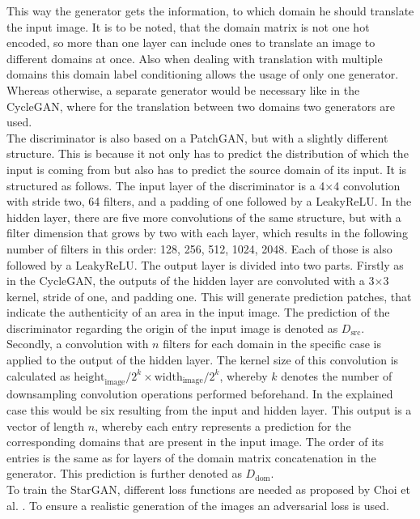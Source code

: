 This way the generator gets the information, to which domain he should translate the input image.
It is to be noted, that the domain matrix is not one hot encoded, so more than one layer can include ones to translate an image to different domains at once.
Also when dealing with translation with multiple domains this domain label conditioning allows the usage of only one generator.
Whereas otherwise, a separate generator would be necessary like in the CycleGAN, where for the translation between two domains two generators are used.\\
The discriminator is also based on a PatchGAN, but with a slightly different structure.
This is because it not only has to predict the distribution of which the input is coming from but also has to predict the source domain of its input.
It is structured as follows.
The input layer of the discriminator is a 4$\times$4 convolution with stride two, 64 filters, and a padding of one followed by a LeakyReLU.
In the hidden layer, there are five more convolutions of the same structure, but with a filter dimension that grows by two with each layer, which results in the following number of filters in this order: 128, 256, 512, 1024, 2048.
Each of those is also followed by a LeakyReLU.
The output layer is divided into two parts.
Firstly as in the CycleGAN, the outputs of the hidden layer are convoluted with a 3$\times$3 kernel, stride of one, and padding one.
This will generate prediction patches, that indicate the authenticity of an area in the input image.
The prediction of the discriminator regarding the origin of the input image is denoted as $D_{\text{src}}$.\\
Secondly, a convolution with $n$ filters for each domain in the specific case is applied to the output of the hidden layer.
The kernel size of this convolution is calculated as $\text{height}_{\text{image}}/2^k \times \text{width}_{\text{image}}/2^k$, whereby $k$ denotes the number of downsampling convolution operations performed beforehand.
In the explained case this would be six resulting from the input and hidden layer.
This output is a vector of length $n$, whereby each entry represents a prediction for the corresponding domains that are present in the input image.
The order of its entries is the same as for layers of the domain matrix concatenation in the generator.
This prediction is further denoted as $D_{\text{dom}}$.\\
To train the StarGAN, different loss functions are needed as proposed by Choi et al. \cite{choi2018stargan}.
To ensure a realistic generation of the images an adversarial loss is used.
